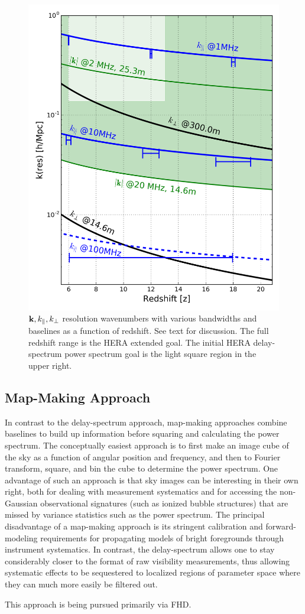 \documentclass[preprint,11pt]{aastex}
\newcommand{\kvec}{{\bf k}}
\def\kperp{k_{\bot}}
\def\kpar{k_{\|}}
\begin{document}
\begin{figure}[h!]
\centerline{
\includegraphics[width=.4\textwidth]{plots/kperf.png} 
}
\caption{\small $\kvec, \kpar, \kperp$ resolution wavenumbers with various bandwidths and baselines as a function of redshift.  See text for discussion.  The full redshift range is the HERA extended goal.  The initial HERA delay-spectrum power spectrum goal is the light square region in the upper right.}
\label{fig:kperf}
\end{figure}

\subsection{Map-Making Approach}
\label{sec:mapapproach}
In contrast to the delay-spectrum approach, map-making approaches combine baselines to build up information before squaring and calculating the power spectrum.  The conceptually easiest approach is to first make an image cube of the sky as a function of angular position and frequency, and then to Fourier transform, square, and bin the cube to determine the power spectrum. One advantage of such an approach is that sky images can be interesting in their own right, both for dealing with measurement systematics and for accessing the non-Gaussian observational signatures (such as ionized bubble structures) that are missed by variance statistics such as the power spectrum. The principal disadvantage of a map-making approach is its stringent calibration and forward-modeling requirements for propagating models of bright foregrounds through instrument systematics. In contrast, the delay-spectrum allows one to stay considerably closer to the format of raw visibility measurements, thus allowing systematic effects to be sequestered to localized regions of parameter space where they can much more easily be filtered out.

This approach is being pursued primarily via FHD.
\end{document}
